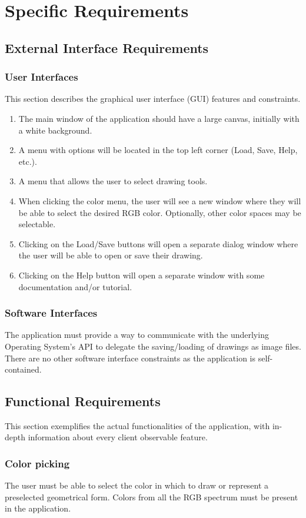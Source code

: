 \documentclass[12pt]{article}
\begin{document}
\section{Specific Requirements}
\subsection{External Interface Requirements}
\subsubsection{User Interfaces}
This section describes the graphical user interface (GUI) features and constraints.
\begin{enumerate}
\item The main window of the application should have a large canvas, initially with a white background.
\item A menu with options will be located in the top left corner (Load, Save, Help, etc.).
\item A menu that allows the user to select drawing tools.
\item When clicking the color menu, the user will see a new window where they will be able to select the desired RGB color. Optionally, other color spaces may be selectable.
\item Clicking on the Load/Save buttons will open a separate dialog window where the user will be able to open or save their drawing.
\item Clicking on the Help button will open a separate window with some documentation and/or tutorial.
\end{enumerate}

\subsubsection{Software Interfaces}
The application must provide a way to communicate with the underlying Operating System's API to delegate the saving/loading of drawings as image files. There are no other software interface constraints as the application is self-contained.
\subsection{Functional Requirements}
This section exemplifies the actual functionalities of the application, with in-depth information about every client observable feature.
\subsubsection{Color picking}
The user must be able to select the color in which to draw or represent a preselected geometrical form. Colors from all the RGB spectrum must be present in the application.
\end{document}
